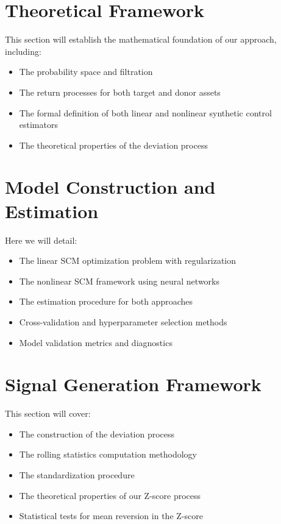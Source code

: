 %

\section{Theoretical Framework}
This section will establish the mathematical foundation of our approach, including:
\begin{itemize}
    \item The probability space and filtration
    \item The return processes for both target and donor assets
    \item The formal definition of both linear and nonlinear synthetic control estimators
    \item The theoretical properties of the deviation process
\end{itemize}

\section{Model Construction and Estimation}
Here we will detail:
\begin{itemize}
    \item The linear SCM optimization problem with regularization
    \item The nonlinear SCM framework using neural networks
    \item The estimation procedure for both approaches
    \item Cross-validation and hyperparameter selection methods
    \item Model validation metrics and diagnostics
\end{itemize}

\section{Signal Generation Framework}
This section will cover:
\begin{itemize}
    \item The construction of the deviation process
    \item The rolling statistics computation methodology
    \item The standardization procedure
    \item The theoretical properties of our Z-score process
    \item Statistical tests for mean reversion in the Z-score
\end{itemize}

